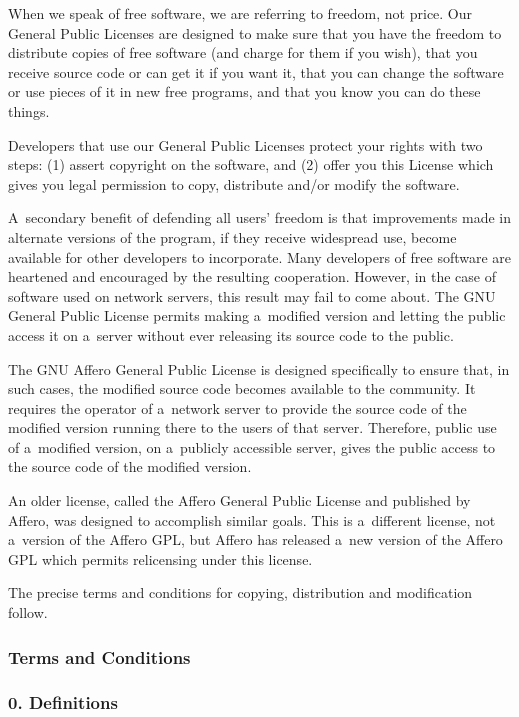 \documentclass[a4paper, 11pt, twoside]{article}
\begin{document}
When we speak of free software, we are referring to freedom, not price. Our General Public Licenses are designed to make sure that you have the freedom to distribute copies of free software (and charge for them if you wish), that you receive source code or can get it if you want it, that you can change the software or use pieces of it in new free programs, and that you know you can do these things.

Developers that use our General Public Licenses protect your rights with two steps: (1) assert copyright on the software, and (2) offer you this License which gives you legal permission to copy, distribute and/or modify the software.

A~secondary benefit of defending all users' freedom is that improvements made in alternate versions of the program, if they receive widespread use, become available for other developers to incorporate. Many developers of free software are heartened and encouraged by the resulting cooperation. However, in the case of software used on network servers, this result may fail to come about. The GNU General Public License permits making a~modified version and letting the public access it on a~server without ever releasing its source code to the public.

The GNU Affero General Public License is designed specifically to ensure that, in such cases, the modified source code becomes available to the community. It requires the operator of a~network server to provide the source code of the modified version running there to the users of that server. Therefore, public use of a~modified version, on a~publicly accessible server, gives the public access to the source code of the modified version.

An older license, called the Affero General Public License and published by Affero, was designed to accomplish similar goals. This is a~different license, not a~version of the Affero GPL, but Affero has released a~new version of the Affero GPL which permits relicensing under this license.

The precise terms and conditions for copying, distribution and modification follow.

\subsubsection{Terms and Conditions}

\subsubsection{0. Definitions}
\end{document}
